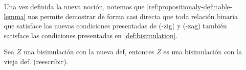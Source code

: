 Una vez definida la nueva noción, notemos que \ref{ref:propositionaly-definable-lemma} nos permite demostrar de forma casi directa que
toda relación binaria que satisface las nuevas condiciones presentadas de (\KHilogic-zig) y (\KHilogic-zag) también satisface las condiciones
presentadas en \ref{def:bisimulation}.

\begin{lema}
    Sea $Z$ una bisimulación con la nueva def, entonces $Z$ es una bisimulación con la vieja def. (reescribir).
\end{lema}